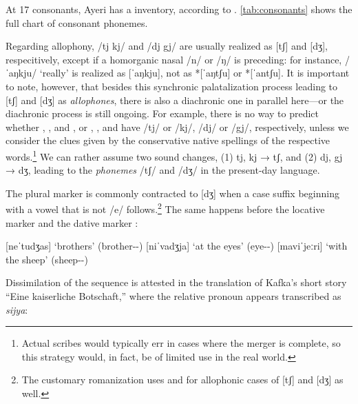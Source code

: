 At 17 consonants, Ayeri has a  inventory, according
to \citet{wals1}. \autoref{tab:consonants} shows the full chart of consonant
phonemes.

Regarding allophony, /tj kj/ and /dj gj/ are usually realized as [tʃ] and [dʒ],
respecitively, except if a homorganic nasal /n/ or /ŋ/ is preceding: for
instance,  /ˈaŋkju/ `really' is realized as [ˈaŋkju], not as
*[ˈaŋtʃu] or *[ˈantʃu]. It is important to note, however, that besides this
synchronic palatalization process leading to [tʃ] and [dʒ] as
\emph{allophones}, there is also a diachronic one in parallel here---or the
diachronic process is still ongoing. For example, there is no way to predict
whether , , and , or ,
, and  have /tj/ or /kj/, /dj/
or /gj/, respectively, unless we consider the clues given by the conservative
native spellings of the respective words.\footnote{Actual scribes would
typically err in cases where the merger is complete, so this strategy would, in
fact, be of limited use in the real world.} We can rather assume two sound
changes, (1) tj, kj → tʃ, and (2) dj, gj → dʒ, leading to the \emph{phonemes}
/tʃ/ and /dʒ/ in the present-day language.

\label{pluralmorph} The plural marker
 is commonly contracted to [dʒ] when a
case suffix beginning with a vowel that is not /e/ follows.\footnote{The
customary romanization uses  and  for allophonic cases of [tʃ]
and [dʒ] as well.} The same happens before the locative marker 
and the dative marker :

\pex
	\a {}
		[neˈtudʒas] `brothers' (brother-\Pl{}-\Parg{})
	\a {}
		[niˈvadʒja] `at the eyes' (eye-\Pl{}-\Loc{})
	\a {}
		[maviˈjeːri] `with the sheep' (sheep-\Pl{}-\Ins{})
\xe

Dissimilation of the sequence  is
attested in the translation of Kafka's short story ``Eine kaiserliche
Botschaft,'' where the relative pronoun  appears transcribed
as \textit{sijya}:


